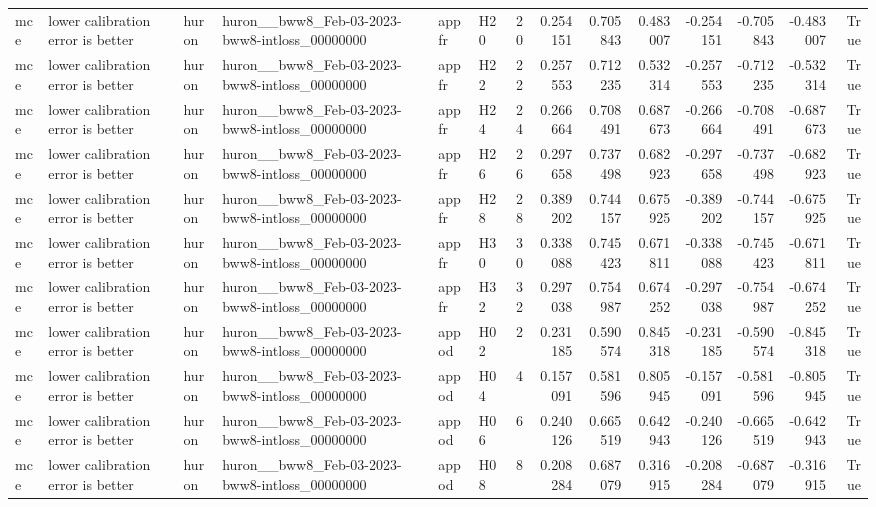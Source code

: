 \begin{longtable}{llllllrrrrrrrr}
mce & lower calibration error is better & huron & huron\_\_bww8\_Feb-03-2023-bww8-intloss\_00000000 & appfr & H20 & 20 & 0.254151 & 0.705843 & 0.483007 & -0.254151 & -0.705843 & -0.483007 & True \\
mce & lower calibration error is better & huron & huron\_\_bww8\_Feb-03-2023-bww8-intloss\_00000000 & appfr & H22 & 22 & 0.257553 & 0.712235 & 0.532314 & -0.257553 & -0.712235 & -0.532314 & True \\
mce & lower calibration error is better & huron & huron\_\_bww8\_Feb-03-2023-bww8-intloss\_00000000 & appfr & H24 & 24 & 0.266664 & 0.708491 & 0.687673 & -0.266664 & -0.708491 & -0.687673 & True \\
mce & lower calibration error is better & huron & huron\_\_bww8\_Feb-03-2023-bww8-intloss\_00000000 & appfr & H26 & 26 & 0.297658 & 0.737498 & 0.682923 & -0.297658 & -0.737498 & -0.682923 & True \\
mce & lower calibration error is better & huron & huron\_\_bww8\_Feb-03-2023-bww8-intloss\_00000000 & appfr & H28 & 28 & 0.389202 & 0.744157 & 0.675925 & -0.389202 & -0.744157 & -0.675925 & True \\
mce & lower calibration error is better & huron & huron\_\_bww8\_Feb-03-2023-bww8-intloss\_00000000 & appfr & H30 & 30 & 0.338088 & 0.745423 & 0.671811 & -0.338088 & -0.745423 & -0.671811 & True \\
mce & lower calibration error is better & huron & huron\_\_bww8\_Feb-03-2023-bww8-intloss\_00000000 & appfr & H32 & 32 & 0.297038 & 0.754987 & 0.674252 & -0.297038 & -0.754987 & -0.674252 & True \\
mce & lower calibration error is better & huron & huron\_\_bww8\_Feb-03-2023-bww8-intloss\_00000000 & appod & H02 & 2 & 0.231185 & 0.590574 & 0.845318 & -0.231185 & -0.590574 & -0.845318 & True \\
mce & lower calibration error is better & huron & huron\_\_bww8\_Feb-03-2023-bww8-intloss\_00000000 & appod & H04 & 4 & 0.157091 & 0.581596 & 0.805945 & -0.157091 & -0.581596 & -0.805945 & True \\
mce & lower calibration error is better & huron & huron\_\_bww8\_Feb-03-2023-bww8-intloss\_00000000 & appod & H06 & 6 & 0.240126 & 0.665519 & 0.642943 & -0.240126 & -0.665519 & -0.642943 & True \\
mce & lower calibration error is better & huron & huron\_\_bww8\_Feb-03-2023-bww8-intloss\_00000000 & appod & H08 & 8 & 0.208284 & 0.687079 & 0.316915 & -0.208284 & -0.687079 & -0.316915 & True \\

\end{longtable}
